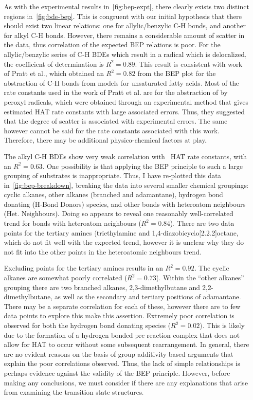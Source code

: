 As with the experimental results in~\ref{fig:bep-expt}, there clearly exists two
distinct regions in~\ref{fig:bde-bep}. This is congruent with our initial
hypothesis that there should exist two linear relations: one for
allylic/benzylic C-H bonds, and another for alkyl C-H bonds. However, there
remains a considerable amount of scatter in the data, thus correlation of the
expected BEP relations is poor. For the allylic/benzylic series of C-H BDEs
which result in a radical which is delocalized, the coefficient of determination
is $R^2 = 0.89$. This result is consistent with work of Pratt et
al.\cite{Pratt2003}, which obtained an $R^2 = 0.82$ from the BEP plot for the
abstraction of C-H bonds from models for unsaturated fatty acids. Most of the
rate constants used in the work of Pratt et al. are for the abstraction of
 by peroxyl radicals, which were obtained through an experimental method
that gives estimated HAT rate constants with large associated errors. Thus, they
suggested that the degree of scatter is associated with experimental errors. The
same however cannot be said for the rate constants associated with this work.
Therefore, there may be additional physico-chemical factors at play.

The alkyl C-H BDEs show very weak correlation with \cumo\ HAT rate constants,
with an $R^2 =0.63$. One possibility is that applying the BEP principle to such
a large grouping of substrates is inappropriate. Thus, I have re-plotted this
data in~\ref{fig:bep-breakdown}, breaking the data into several smaller chemical
groupings: cyclic alkanes, other alkanes (branched and adamantane), hydrogen
bond donating (H-Bond Donors) species, and other  bonds with heteroatom
neighbours (Het. Neighbours). Doing so appears to reveal one reasonably
well-correlated trend for  bonds with heteroatom neighbours ($R^2 =
0.84$). There are two data points for the tertiary amines (triethylamine and
1,4-diazobicyclo[2.2.2]octane, which do not fit well with the expected trend,
however it is unclear why they do not fit into the other points in the
heteroatomic neighbours trend.

Excluding points for the tertiary amines results in an $R^2 = 0.92$.  The cyclic
alkanes are somewhat poorly correlated ($R^2 = 0.73$). Within the ``other
alkanes'' grouping there are two branched alkanes, 2,3-dimethylbutane and
2,2-dimethylbutane, as well as the secondary and tertiary  positions of
adamantane. There may be a separate correlation for each of these, however
there are to few data points to explore this make this assertion. Extremely
poor correlation is observed for both the hydrogen bond donating species ($R^2
= 0.02$). This is likely due to the formation of a hydrogen bonded pre-reaction
complex that does not allow for HAT to occur without some subsequent
rearrangement. In general, there are no evident reasons on the basis of
group-additivity based arguments that explain the poor correlations observed.
Thus, the lack of simple relationships is perhaps evidence against the validity
of the BEP principle. However, before making any conclusions, we must consider
if there are any explanations that arise from examining the transition state
structures.

